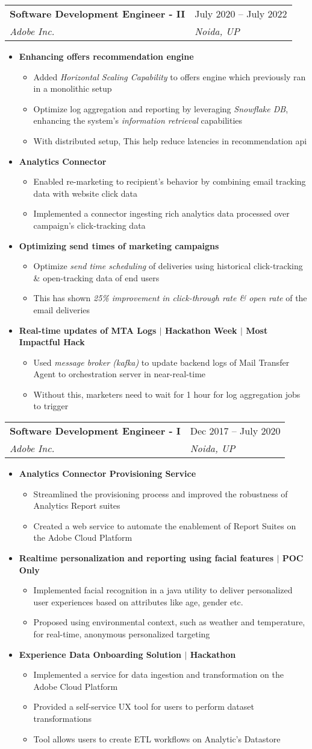 \documentclass[a4paper,11pt]{article}
\makeatletter
\newcommand\sbullet[1][0.75]{\mathbin{\vcenter{\hbox{\scalebox{#1}{$\bullet$}}}}}
\newcommand{\resumeProjectItem}[1]{
  \item[$\sbullet$]\small{
    {#1 \vspace{1pt}}
  }
}
\newcommand{\resumeSubheading}[4]{
  \vspace{-2pt}\item
    \begin{tabular*}{0.97\textwidth}[t]{l@{\extracolsep{\fill}}l}
      \textbf{#1} & #2 \\
      \textit{\normalsize#3} & \textit{\normalsize #4} \\
    \end{tabular*}\vspace{-7pt}
}
\newcommand{\resumeProjectHeadingListStart}{\begin{itemize}}
\newcommand{\resumeProjectHeadingListEnd}{\end{itemize}}
\newcommand{\resumeProjectHeading}[1]{
    \item[\textbf{-}]\textbf{#1} \\
}
\newcommand{\resumeItemListStart}{\begin{itemize}}
\newcommand{\resumeItemListEnd}{\end{itemize}\vspace{-5pt}}
\makeatother
\begin{document}
\resumeSubheading
{Software Development Engineer - II}{July 2020 -- July 2022}
{Adobe Inc.}{Noida, UP}
\resumeProjectHeadingListStart
\resumeProjectHeading{Enhancing offers recommendation engine}
\resumeItemListStart
\resumeProjectItem{Added \emph{Horizontal Scaling Capability} to offers engine which previously ran in a monolithic setup}
\resumeProjectItem{Optimize log aggregation and reporting by leveraging \emph{Snowflake DB}, enhancing the system's \emph{information retrieval} capabilities}
\resumeProjectItem{With distributed setup, This help reduce latencies in recommendation api}
\resumeItemListEnd
\resumeProjectHeadingListEnd
\resumeProjectHeadingListStart
\resumeProjectHeading{Analytics Connector}
\resumeItemListStart
\resumeProjectItem{Enabled re-marketing to recipient's behavior by combining email tracking data with website click data}
\resumeProjectItem{Implemented a connector ingesting rich analytics data processed over campaign's click-tracking data}
\resumeItemListEnd
\resumeProjectHeadingListEnd
\resumeProjectHeadingListStart
\resumeProjectHeading{Optimizing send times of marketing campaigns}
\resumeItemListStart
\resumeProjectItem{Optimize \emph{send time scheduling} of deliveries using historical click-tracking \& open-tracking data of end users}
\resumeProjectItem{This has shown \emph{25\% improvement in click-through rate \& open rate} of the email deliveries}
\resumeItemListEnd
\resumeProjectHeadingListEnd
\resumeProjectHeadingListStart
\resumeProjectHeading{Real-time updates of MTA Logs $|$ Hackathon Week $|$ Most Impactful Hack}
\resumeItemListStart
\resumeProjectItem{Used \emph{message broker (kafka)} to update backend logs of Mail Transfer Agent to orchestration server in near-real-time}
\resumeProjectItem{Without this, marketers need to wait for 1 hour for log aggregation jobs to trigger}
\resumeItemListEnd
\resumeProjectHeadingListEnd
\resumeSubheading
{Software Development Engineer - I}{Dec 2017 -- July 2020}
{Adobe Inc.}{Noida, UP}
\resumeProjectHeadingListStart
\resumeProjectHeading{Analytics Connector Provisioning Service}
\resumeItemListStart
\resumeProjectItem{Streamlined the provisioning process and improved the robustness of Analytics Report suites}
\resumeProjectItem{Created a web service to automate the enablement of Report Suites on the Adobe Cloud Platform}
\resumeItemListEnd
\resumeProjectHeadingListEnd
\resumeProjectHeadingListStart
\resumeProjectHeading{Realtime personalization and reporting using facial features $|$ POC Only}
\resumeItemListStart
\resumeProjectItem{Implemented facial recognition in a java utility to deliver personalized user experiences based on attributes like age, gender etc.}
\resumeProjectItem{Proposed using environmental context, such as weather and temperature, for real-time, anonymous personalized targeting}
\resumeItemListEnd
\resumeProjectHeadingListEnd
\resumeProjectHeadingListStart
\resumeProjectHeading{Experience Data Onboarding Solution $|$ Hackathon}
\resumeItemListStart
\resumeProjectItem{Implemented a service for data ingestion and transformation on the Adobe Cloud Platform}
\resumeProjectItem{Provided a self-service UX tool for users to perform dataset transformations}
\resumeProjectItem{Tool allows users to create ETL workflows on Analytic's Datastore}
\resumeItemListEnd
\resumeProjectHeadingListEnd
\end{document}
